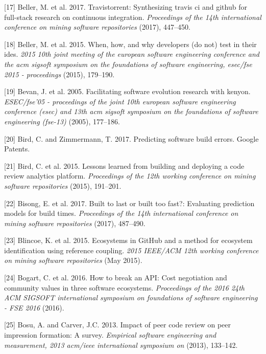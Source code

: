 \documentclass[]{book}
\begin{document}
\hypertarget{ref-beller2017travistorrent}{}
{[}17{]} Beller, M. et al. 2017. Travistorrent: Synthesizing travis ci
and github for full-stack research on continuous integration.
\emph{Proceedings of the 14th international conference on mining
software repositories} (2017), 447--450.

\hypertarget{ref-beller2015}{}
{[}18{]} Beller, M. et al. 2015. When, how, and why developers (do not)
test in their ides. \emph{2015 10th joint meeting of the european
software engineering conference and the acm sigsoft symposium on the
foundations of software engineering, esec/fse 2015 - proceedings}
(2015), 179--190.

\hypertarget{ref-bevan2005}{}
{[}19{]} Bevan, J. et al. 2005. Facilitating software evolution research
with kenyon. \emph{ESEC/fse'05 - proceedings of the joint 10th european
software engineering conference (esec) and 13th acm sigsoft symposium on
the foundations of software engineering (fse-13)} (2005), 177--186.

\hypertarget{ref-bird2017predicting}{}
{[}20{]} Bird, C. and Zimmermann, T. 2017. Predicting software build
errors. Google Patents.

\hypertarget{ref-bird2015lessons}{}
{[}21{]} Bird, C. et al. 2015. Lessons learned from building and
deploying a code review analytics platform. \emph{Proceedings of the
12th working conference on mining software repositories} (2015),
191--201.

\hypertarget{ref-bisong2017built}{}
{[}22{]} Bisong, E. et al. 2017. Built to last or built too fast?:
Evaluating prediction models for build times. \emph{Proceedings of the
14th international conference on mining software repositories} (2017),
487--490.

\hypertarget{ref-Blincoe2015}{}
{[}23{]} Blincoe, K. et al. 2015. Ecosystems in GitHub and a method for
ecosystem identification using reference coupling. \emph{2015 IEEE/ACM
12th working conference on mining software repositories} (May 2015).

\hypertarget{ref-Bogart2016}{}
{[}24{]} Bogart, C. et al. 2016. How to break an API: Cost negotiation
and community values in three software ecosystems. \emph{Proceedings of
the 2016 24th ACM SIGSOFT international symposium on foundations of
software engineering - FSE 2016} (2016).

\hypertarget{ref-bosu2013impact}{}
{[}25{]} Bosu, A. and Carver, J.C. 2013. Impact of peer code review on
peer impression formation: A survey. \emph{Empirical software
engineering and measurement, 2013 acm/ieee international symposium on}
(2013), 133--142.
\end{document}
